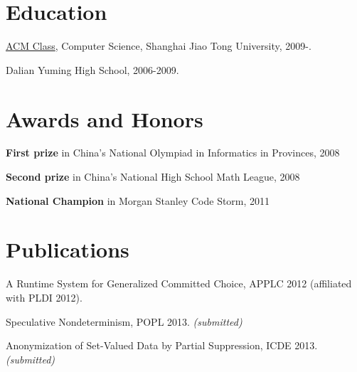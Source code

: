 \documentclass[letterpaper]{article}
\renewenvironment{itemize}{
  \begin{list}{}{
    \setlength{\leftmargin}{1.5em}
    \vspace{-3mm}
  }
}{
  \end{list}
}
\begin{document}
\vspace{-7mm}
\section*{Education}

\begin{itemize}
  \item \href{http://acm.sjtu.edu.cn/}{ACM Class}, Computer Science, Shanghai Jiao Tong University, 2009-.
  \item Dalian Yuming High School, 2006-2009.
\end{itemize}


\vspace{-7mm}
\section*{Awards and Honors}

\begin{itemize}
  \item \textbf{First prize} in China's National Olympiad in Informatics in Provinces, 2008
  \item \textbf{Second prize} in China's National High School Math League, 2008
  \item \textbf{National Champion} in Morgan Stanley Code Storm, 2011
\end{itemize}


\vspace{-7mm}
\section*{Publications}

\begin{itemize}
  \item A Runtime System for Generalized Committed Choice, APPLC 2012 (affiliated with PLDI 2012). \\
  \item Speculative Nondeterminism, POPL 2013. \emph{(submitted)} \\
  \item Anonymization of Set-Valued Data by Partial Suppression, ICDE 2013. \emph{(submitted)} \\
\end{itemize}
\end{document}
